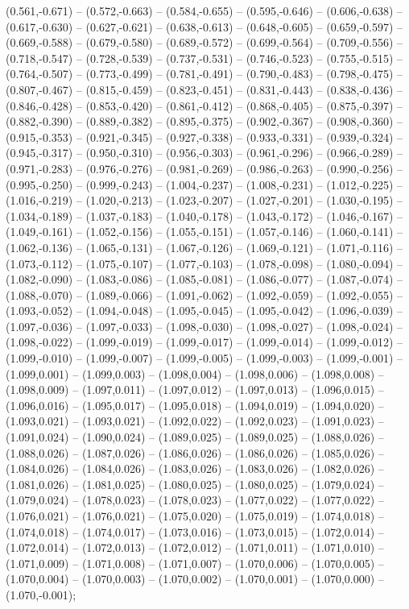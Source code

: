 (0.561,-0.671) -- (0.572,-0.663) -- (0.584,-0.655) -- (0.595,-0.646) -- (0.606,-0.638) -- (0.617,-0.630) -- (0.627,-0.621) -- (0.638,-0.613) -- (0.648,-0.605) -- (0.659,-0.597) -- (0.669,-0.588) -- (0.679,-0.580) -- (0.689,-0.572) -- (0.699,-0.564) -- (0.709,-0.556) -- (0.718,-0.547) -- (0.728,-0.539) -- (0.737,-0.531) -- (0.746,-0.523) -- (0.755,-0.515) -- (0.764,-0.507) -- (0.773,-0.499) -- (0.781,-0.491) -- (0.790,-0.483) -- (0.798,-0.475) -- (0.807,-0.467) -- (0.815,-0.459) -- (0.823,-0.451) -- (0.831,-0.443) -- (0.838,-0.436) -- (0.846,-0.428) -- (0.853,-0.420) -- (0.861,-0.412) -- (0.868,-0.405) -- (0.875,-0.397) -- (0.882,-0.390) -- (0.889,-0.382) -- (0.895,-0.375) -- (0.902,-0.367) -- (0.908,-0.360) -- (0.915,-0.353) -- (0.921,-0.345) -- (0.927,-0.338) -- (0.933,-0.331) -- (0.939,-0.324) -- (0.945,-0.317) -- (0.950,-0.310) -- (0.956,-0.303) -- (0.961,-0.296) -- (0.966,-0.289) -- (0.971,-0.283) -- (0.976,-0.276) -- (0.981,-0.269) -- (0.986,-0.263) -- (0.990,-0.256) -- (0.995,-0.250) -- (0.999,-0.243) -- (1.004,-0.237) -- (1.008,-0.231) -- (1.012,-0.225) -- (1.016,-0.219) -- (1.020,-0.213) -- (1.023,-0.207) -- (1.027,-0.201) -- (1.030,-0.195) -- (1.034,-0.189) -- (1.037,-0.183) -- (1.040,-0.178) -- (1.043,-0.172) -- (1.046,-0.167) -- (1.049,-0.161) -- (1.052,-0.156) -- (1.055,-0.151) -- (1.057,-0.146) -- (1.060,-0.141) -- (1.062,-0.136) -- (1.065,-0.131) -- (1.067,-0.126) -- (1.069,-0.121) -- (1.071,-0.116) -- (1.073,-0.112) -- (1.075,-0.107) -- (1.077,-0.103) -- (1.078,-0.098) -- (1.080,-0.094) -- (1.082,-0.090) -- (1.083,-0.086) -- (1.085,-0.081) -- (1.086,-0.077) -- (1.087,-0.074) -- (1.088,-0.070) -- (1.089,-0.066) -- (1.091,-0.062) -- (1.092,-0.059) -- (1.092,-0.055) -- (1.093,-0.052) -- (1.094,-0.048) -- (1.095,-0.045) -- (1.095,-0.042) -- (1.096,-0.039) -- (1.097,-0.036) -- (1.097,-0.033) -- (1.098,-0.030) -- (1.098,-0.027) -- (1.098,-0.024) -- (1.098,-0.022) -- (1.099,-0.019) -- (1.099,-0.017) -- (1.099,-0.014) -- (1.099,-0.012) -- (1.099,-0.010) -- (1.099,-0.007) -- (1.099,-0.005) -- (1.099,-0.003) -- (1.099,-0.001) -- (1.099,0.001) -- (1.099,0.003) -- (1.098,0.004) -- (1.098,0.006) -- (1.098,0.008) -- (1.098,0.009) -- (1.097,0.011) -- (1.097,0.012) -- (1.097,0.013) -- (1.096,0.015) -- (1.096,0.016) -- (1.095,0.017) -- (1.095,0.018) -- (1.094,0.019) -- (1.094,0.020) -- (1.093,0.021) -- (1.093,0.021) -- (1.092,0.022) -- (1.092,0.023) -- (1.091,0.023) -- (1.091,0.024) -- (1.090,0.024) -- (1.089,0.025) -- (1.089,0.025) -- (1.088,0.026) -- (1.088,0.026) -- (1.087,0.026) -- (1.086,0.026) -- (1.086,0.026) -- (1.085,0.026) -- (1.084,0.026) -- (1.084,0.026) -- (1.083,0.026) -- (1.083,0.026) -- (1.082,0.026) -- (1.081,0.026) -- (1.081,0.025) -- (1.080,0.025) -- (1.080,0.025) -- (1.079,0.024) -- (1.079,0.024) -- (1.078,0.023) -- (1.078,0.023) -- (1.077,0.022) -- (1.077,0.022) -- (1.076,0.021) -- (1.076,0.021) -- (1.075,0.020) -- (1.075,0.019) -- (1.074,0.018) -- (1.074,0.018) -- (1.074,0.017) -- (1.073,0.016) -- (1.073,0.015) -- (1.072,0.014) -- (1.072,0.014) -- (1.072,0.013) -- (1.072,0.012) -- (1.071,0.011) -- (1.071,0.010) -- (1.071,0.009) -- (1.071,0.008) -- (1.071,0.007) -- (1.070,0.006) -- (1.070,0.005) -- (1.070,0.004) -- (1.070,0.003) -- (1.070,0.002) -- (1.070,0.001) -- (1.070,0.000) -- (1.070,-0.001);
